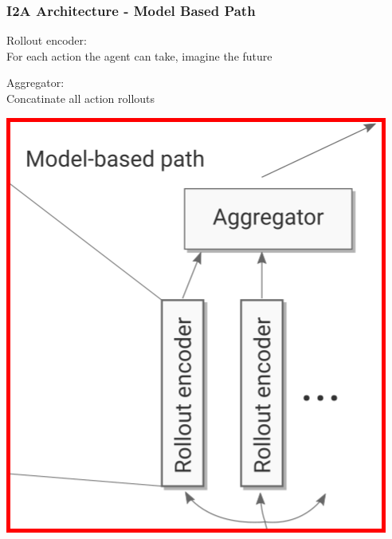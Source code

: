 \begin{frame}
    \frametitle{I2A Architecture - Model Based Path}

\begin{multicols}{2}
	\begin{PraesentationAufzaehlung}
	    \item Rollout encoder:\\
		For each action the agent can take, 
		imagine the future%
		\item Aggregator: \\
		Concatinate all action rollouts
	\end{PraesentationAufzaehlung}
    \vfill\columnbreak
	\begin{center}
    \includegraphics[height=.5\textheight]{./Images/i2a_model_based.png}%
	\end{center}
\end{multicols}
    
\end{frame}
\clearpage




